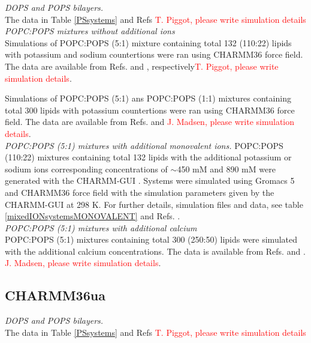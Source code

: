 \documentclass[journal=jpcbfk]{achemso}
\newcommand{\todo}[1]{\textcolor{red}{#1}}
\begin{document}
\noindent
{\it DOPS and POPS bilayers.} \\
The data in Table \ref{PSsystems} and Refs 
\todo{T. Piggot, please write simulation details} \\

\noindent
{\it POPC:POPS mixtures without additional ions}\\
Simulations of POPC:POPS (5:1) mixture containing total 132 (110:22) lipids
with potassium and sodium countertions were ran using CHARMM36 force field.
The data are available from Refs. 
and , respectively\todo{T. Piggot, please write simulation details}.

Simulations of POPC:POPS (5:1) ans POPC:POPS (1:1) mixtures containing total 300 lipids
with potassium countertions were ran using CHARMM36 force field.
The data are available from Refs.  and  
\todo{J. Madsen, please write simulation details}. \\

\noindent
{\it POPC:POPS (5:1) mixtures with additional monovalent ions.}
POPC:POPS (110:22) mixtures containing total 132 lipids with the additional
potassium or sodium ions corresponding concentrations of $\sim$450 mM and 890 mM
were generated with the CHARMM-GUI \cite{lee16,jo18}. Systems were simulated using
Gromacs 5 \cite{abraham2015gromacs} and CHARMM36 force field with the simulation
parameters given by the CHARMM-GUI at 298 K. For further details, simulation files
and data, see table \ref{mixedIONsystemsMONOVALENT} and
Refs. . \\


\noindent
{\it POPC:POPS (5:1) mixtures with additional calcium} \\
POPC:POPS (5:1) mixtures containing total 300 (250:50) lipids
were simulated with the additional calcium concentrations.
The data is available from Refs.  and .
\todo{J. Madsen, please write simulation details}. \\

\subsection{CHARMM36ua}
\noindent
{\it DOPS and POPS bilayers.} \\
The data in Table \ref{PSsystems} and Refs 
\todo{T. Piggot, please write simulation details} \\
\end{document}
